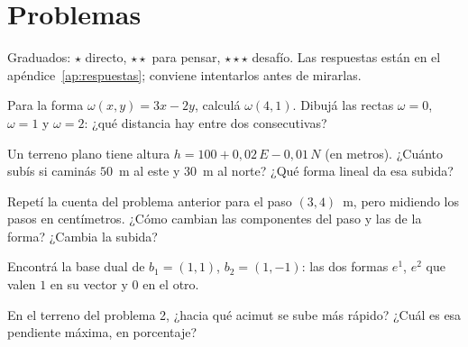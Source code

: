 \section{Problemas}\label{sec:problemas-05}

Graduados: \({\star}\) directo, \({\star}{\star}\) para pensar, \({\star}{\star}{\star}\) desafío. Las respuestas están en el apéndice~\ref{ap:respuestas}; conviene intentarlos antes de mirarlas.

\begin{problema}[\({\star}\)]\label{pb:05-1}
Para la forma \(\omega(x,y)=3x-2y\), calculá \(\omega(4,1)\). Dibujá las rectas \(\omega=0\), \(\omega=1\) y \(\omega=2\): ¿qué distancia hay entre dos consecutivas?
\end{problema}

\begin{problema}[\({\star}{\star}\)]\label{pb:05-2}
Un terreno plano tiene altura \(h=100+0{,}02\,E-0{,}01\,N\) (en metros). ¿Cuánto subís si caminás \(50\)~m al este y \(30\)~m al norte? ¿Qué forma lineal da esa subida?
\end{problema}

\begin{problema}[\({\star}{\star}\)]\label{pb:05-3}
Repetí la cuenta del problema anterior para el paso \((3,4)\)~m, pero midiendo los pasos en centímetros. ¿Cómo cambian las componentes del paso y las de la forma? ¿Cambia la subida?
\end{problema}

\begin{problema}[\({\star}{\star}\)]\label{pb:05-4}
Encontrá la base dual de \(b_1=(1,1)\), \(b_2=(1,-1)\): las dos formas \(e^1\), \(e^2\) que valen \(1\) en su vector y \(0\) en el otro.
\end{problema}

\begin{problema}[\({\star}{\star}{\star}\)]\label{pb:05-5}
En el terreno del problema 2, ¿hacia qué acimut se sube más rápido? ¿Cuál es esa pendiente máxima, en porcentaje?
\end{problema}

